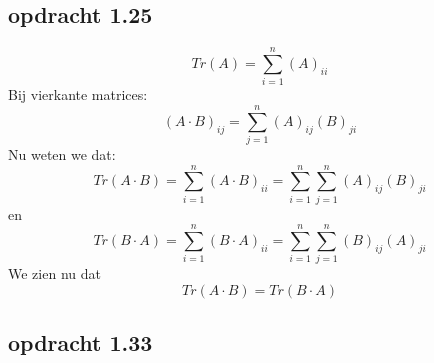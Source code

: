 \documentclass[10pt,a4paper]{article}
\begin{document}
\subsection*{opdracht 1.25}
\[
Tr(A) = \sum^{n}_{i=1}(A)_{ii}
\]
Bij vierkante matrices:
\[
(A\cdot B)_{ij} = \sum^{n}_{j=1}(A)_{ij}(B)_{ji}
\]
Nu weten we dat:
\[
Tr(A\cdot B) =\sum^{n}_{i=1}(A\cdot B)_{ii}=\sum^{n}_{i=1}\sum^{n}_{j=1}(A)_{ij}(B)_{ji}
\]
en
\[
Tr(B\cdot A) =\sum^{n}_{i=1}(B\cdot A)_{ii}=\sum^{n}_{i=1}\sum^{n}_{j=1}(B)_{ij}(A)_{ji}
\]
We zien nu dat
\[
Tr(A\cdot B) = Tr(B\cdot A)
\]

\subsection*{opdracht 1.33}
\end{document}
